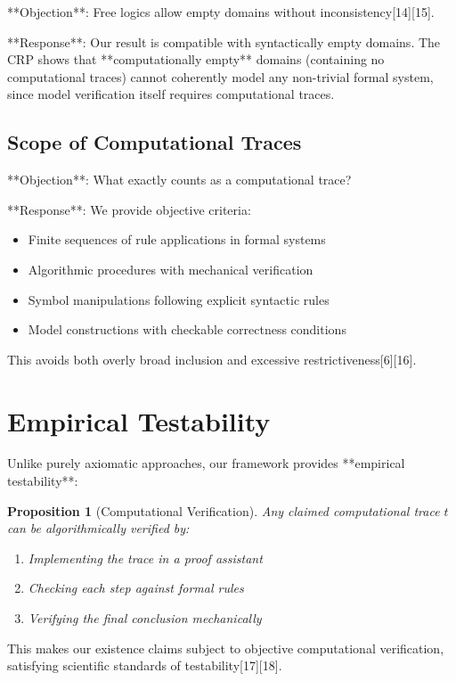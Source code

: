 \documentclass[12pt]{article}
\newtheorem{proposition}[theorem]{Proposition}
\begin{document}
**Objection**: Free logics allow empty domains without inconsistency[14][15].

**Response**: Our result is compatible with syntactically empty domains. The CRP shows that **computationally empty** domains (containing no computational traces) cannot coherently model any non-trivial formal system, since model verification itself requires computational traces.

\subsection{Scope of Computational Traces}

**Objection**: What exactly counts as a computational trace?

**Response**: We provide objective criteria:
\begin{itemize}
\item Finite sequences of rule applications in formal systems
\item Algorithmic procedures with mechanical verification  
\item Symbol manipulations following explicit syntactic rules
\item Model constructions with checkable correctness conditions
\end{itemize}
This avoids both overly broad inclusion and excessive restrictiveness[6][16].

\section{Empirical Testability}

Unlike purely axiomatic approaches, our framework provides **empirical testability**:

\begin{proposition}[Computational Verification]
Any claimed computational trace $t$ can be algorithmically verified by:
\begin{enumerate}
\item Implementing the trace in a proof assistant
\item Checking each step against formal rules
\item Verifying the final conclusion mechanically
\end{enumerate}
\end{proposition}

This makes our existence claims subject to objective computational verification, satisfying scientific standards of testability[17][18].
\end{document}

